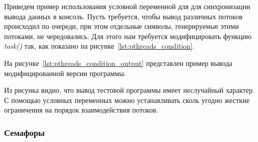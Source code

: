 Приведем пример использования условной переменной для для синхронизации вывода данных в консоль.
Пусть требуется, чтобы вывод различных потоков происходил по очереди,
при этом отдельные символы, генерируемые этими потоками, не чередовались.
Для этого нам требуется модифицировать функцию \textit{task()} так, как показано на
рисунке~\ref{lst:pthreads_condition}.



На рисунке~\ref{lst:pthreads_condition_output} представлен пример вывода
модифицированной версии программы.


\pagebreak

Из рисунка видно, что вывод тестовой программы имеет неслучайный характер.
С помощью условных переменных можно устанавливать сколь угодно жесткие ограничения
на порядок взаимодействия потоков.

\subsubsection{Семафоры}

